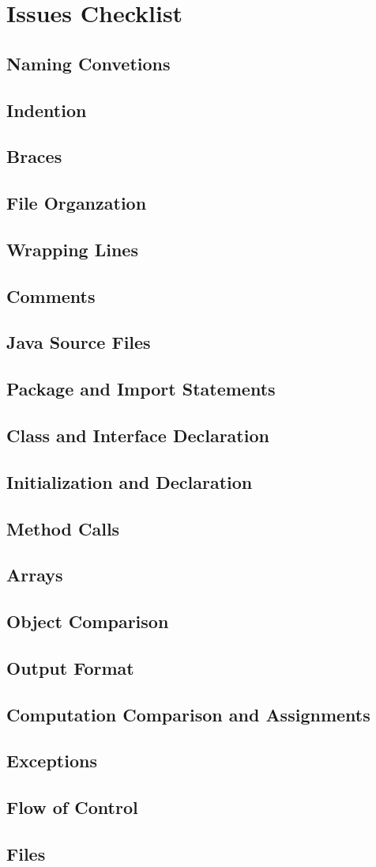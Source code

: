 \section{Issues Checklist}
\subsection{Naming Convetions}
\subsection{Indention}
\subsection{Braces}
\subsection{File Organzation}
\subsection{Wrapping Lines}
\subsection{Comments}
\subsection{Java Source Files}
\subsection{Package and Import Statements}
\subsection{Class and Interface Declaration}
\subsection{Initialization and Declaration}
\subsection{Method Calls}
\subsection{Arrays}
\subsection{Object Comparison}
\subsection{Output Format}
\subsection{Computation Comparison and Assignments}
\subsection{Exceptions}
\subsection{Flow of Control}
\subsection{Files}